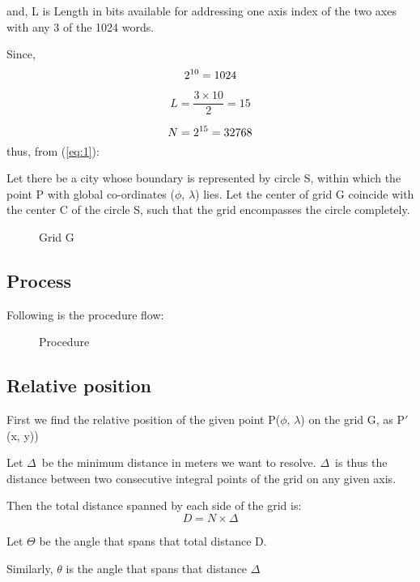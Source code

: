 \documentclass[conference]{IEEEtran}
\begin{document}
and, L is Length in bits available for addressing one axis index of the two axes with any 3 of the 1024 words.

Since, \begin{equation} 2\textsuperscript{10} = 1024 \end{equation}

\begin{equation} L = \frac {3 \times 10} {2} = 15 \end{equation}

\begin{equation}N = 2\textsuperscript{15} = 32768 \end{equation}
thus, from (\ref{eq:1}):

Let there be a city whose boundary is represented by circle S, within which the point P with global co-ordinates ($\phi$, $\lambda$) lies. Let the center of grid G coincide with the center C of the circle S, such that the grid encompasses the circle completely.


\begin{figure}[H]
\centerline{}
\caption{Grid G}
\label{Grid}
\end{figure}

\subsection{Process} Following is the procedure flow:
\begin{figure}[H]
\centerline{}
\caption{Procedure}
\label{Procedure}
\end{figure}

\subsection{Relative position} First we find the relative position of the given point P($\phi$, $\lambda$) on the grid G, as P$'$(x, y))

Let $\Delta$\ be the minimum distance in meters we want to resolve.
$\Delta$\ is thus the distance between two consecutive integral points of the grid on any given axis.

Then the total distance spanned by each side of the grid is:
\begin{equation}D = N \times \Delta\end{equation}

Let $\Theta$ be the angle that spans that total distance D.

Similarly, $\theta$ is the angle that spans that distance $\Delta$
\end{document}
